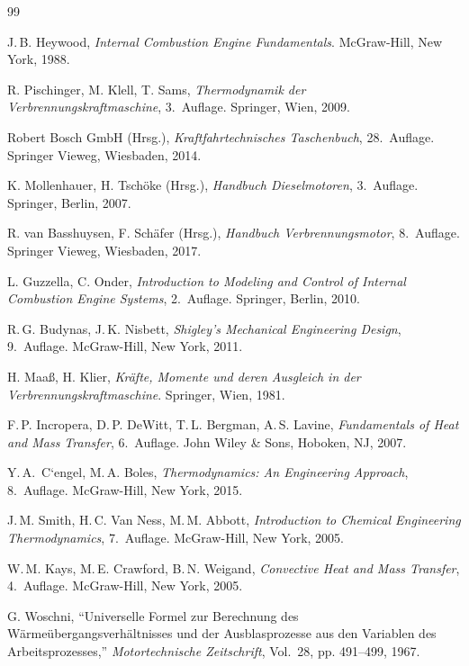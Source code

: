 ﻿\documentclass[a4paper,12pt]{article}
\begin{document}
\begin{thebibliography}{99}
	
	J.\,B. Heywood,
	\textit{Internal Combustion Engine Fundamentals}.
	McGraw-Hill, New York, 1988.
	
	R. Pischinger, M. Klell, T. Sams,
	\textit{Thermodynamik der Verbrennungskraftmaschine}, 3.~Auflage.
	Springer, Wien, 2009.
	
	Robert Bosch GmbH (Hrsg.),
	\textit{Kraftfahrtechnisches Taschenbuch}, 28.~Auflage.
	Springer Vieweg, Wiesbaden, 2014.
	
	K. Mollenhauer, H. Tsch{\"o}ke (Hrsg.),
	\textit{Handbuch Dieselmotoren}, 3.~Auflage.
	Springer, Berlin, 2007.
	
	R. van Basshuysen, F. Sch{\"a}fer (Hrsg.),
	\textit{Handbuch Verbrennungsmotor}, 8.~Auflage.
	Springer Vieweg, Wiesbaden, 2017.
	
	L. Guzzella, C. Onder,
	\textit{Introduction to Modeling and Control of Internal Combustion Engine Systems},
	2.~Auflage. Springer, Berlin, 2010.
	
	R.\,G. Budynas, J.\,K. Nisbett,
	\textit{Shigley's Mechanical Engineering Design}, 9.~Auflage.
	McGraw-Hill, New York, 2011.
	
	H. Maa{\ss}, H. Klier,
	\textit{Kr{\"a}fte, Momente und deren Ausgleich in der Verbrennungskraftmaschine}.
	Springer, Wien, 1981.
	
	F.\,P. Incropera, D.\,P. DeWitt, T.\,L. Bergman, A.\,S. Lavine,
	\textit{Fundamentals of Heat and Mass Transfer}, 6.~Auflage.
	John Wiley \& Sons, Hoboken, NJ, 2007.
	
	Y.\,A. \,C\textquoteleft engel, M.\,A. Boles,
	\textit{Thermodynamics: An Engineering Approach}, 8.~Auflage.
	McGraw-Hill, New York, 2015.
	
	J.\,M. Smith, H.\,C. Van Ness, M.\,M. Abbott,
	\textit{Introduction to Chemical Engineering Thermodynamics}, 7.~Auflage.
	McGraw-Hill, New York, 2005.
	
	W.\,M. Kays, M.\,E. Crawford, B.\,N. Weigand,
	\textit{Convective Heat and Mass Transfer}, 4.~Auflage.
	McGraw-Hill, New York, 2005.
	
	G. Woschni,
	``Universelle Formel zur Berechnung des Wärmeübergangsverhältnisses und der Ausblasprozesse aus den Variablen des Arbeitsprozesses,''
	\textit{Motortechnische Zeitschrift}, Vol.~28, pp. 491--499, 1967.
	

\end{thebibliography}
\end{document}
